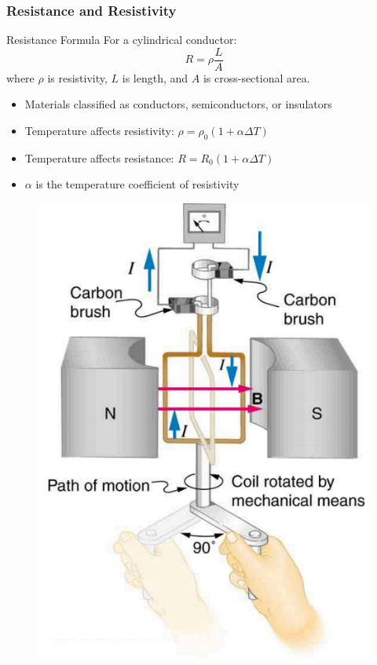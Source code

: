 \documentclass{beamer}
\begin{document}
\begin{frame}
    \frametitle{Resistance and Resistivity}
    \begin{block}{Resistance Formula}
        For a cylindrical conductor:
        \[ R = \rho\frac{L}{A} \]
        where $\rho$ is resistivity, $L$ is length, and $A$ is cross-sectional area.
    \end{block}
    \begin{itemize}
        \item Materials classified as conductors, semiconductors, or insulators
        \item Temperature affects resistivity: $\rho = \rho_0(1 + \alpha\Delta T)$
        \item Temperature affects resistance: $R = R_0(1 + \alpha\Delta T)$
        \item $\alpha$ is the temperature coefficient of resistivity
    \end{itemize}
\end{frame}
\begin{frame}{}
    \begin{figure}
        \centering
        \includegraphics[width=1\linewidth]{phys12-circuits-rc-circuit-diagram.png}
    \end{figure}
\end{frame}
\end{document}
